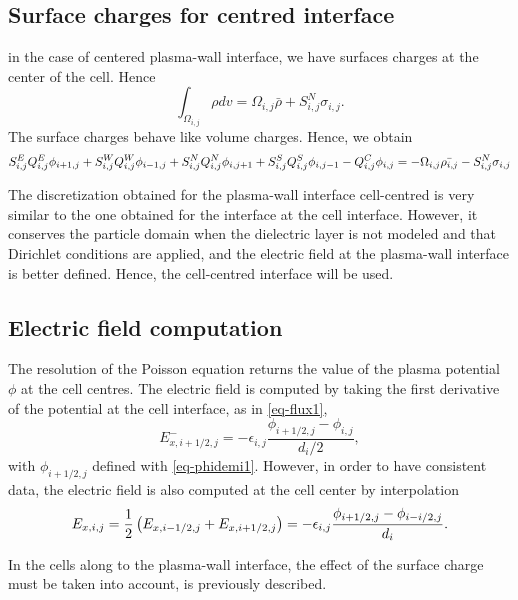   \subsection{Surface charges for centred interface}
    in the case of centered plasma-wall interface, we have surfaces charges at the center of the cell.
    Hence
    \begin{equation}
    \int_{\Omega_{i,j}} \rho dv = \Omega_{i,j}\bar{\rho} + S_{i,j}^N \sigma_{i,j}.
    \end{equation}
    The surface charges behave like volume charges.
    Hence, we obtain
    \begin{equation}
    S^E_{i,j} Q^E_{i,j} \phi_{i+1,j} + S^W_{i,j} Q^W_{i,j} \phi_{i-1,j} + S^N_{i,j} Q^N_{i,j} \phi_{i,j+1} + S^S_{i,j} Q^S_{i,j} \phi_{i,j-1} - Q^C_{i,j} \phi_{i,j} = - \Omega_{i,j} \bar{\rho_{i,j}} - S^N_{i,j} \sigma_{i,j}
    \end{equation}

    The discretization obtained for the plasma-wall interface cell-centred is very similar to the one obtained for the interface at the cell interface.
    However, it conserves the particle domain when the dielectric layer is not modeled and that Dirichlet conditions are applied, and the electric field at the plasma-wall interface is better defined.
    Hence, the cell-centred interface will be used.

    
  \subsection{Electric field computation}
  
    The resolution of the Poisson equation returns the value of the plasma potential $\phi$ at the cell centres.
    The electric field is computed by taking the first derivative of the potential at the cell interface, as in \cref{eq-flux1},
    \begin{equation} \label{eq-E_ihalf}
      E_{x, i+1/2,j}^- = - \epsilon_{i,j} \frac{\phi_{i+1/2,j} - \phi_{i,j}}{d_i/2},
    \end{equation}
    with $\phi_{i+1/2,j}$ defined with \cref{eq-phidemi1}.
    However, in order to have consistent data, the electric field is also computed at the cell center by interpolation
    \begin{equation} \label{eq-E_mean}
      E_{x, i, j} = \frac{1}{2} \left( E_{x, i-1/2,j} + E_{x, i+1/2,j} \right) =  - \epsilon_{i,j} \frac{\phi_{i+1/2,j} - \phi_{i-i/2,j}}{d_i}.
    \end{equation}
    
    In the cells along to the plasma-wall interface, the effect of the surface charge must be taken into account, is previously described.
    
  
  
  